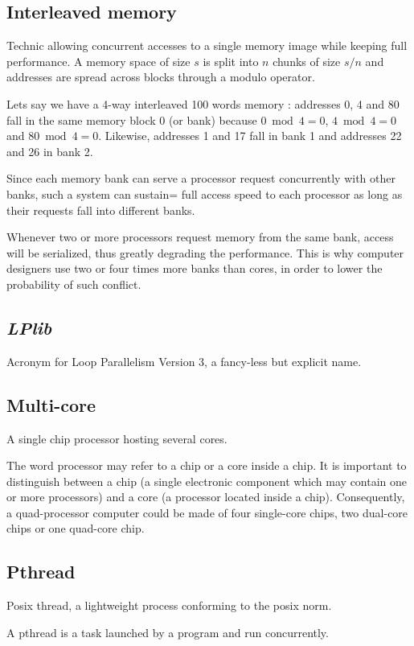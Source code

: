 \documentclass[a4paper,12pt]{article}
\begin{document}
\subsection{Interleaved memory}
Technic allowing concurrent accesses to a single memory image while keeping full performance. A memory space of size $s$ is split into $n$ chunks of size $s/n$ and addresses are spread across blocks through a modulo operator.

Lets say we have a 4-way interleaved 100 words memory :
addresses 0, 4 and 80 fall in the same memory block 0 (or bank) because $0 \bmod 4 = 0$, $4 \bmod 4 = 0$ and $80 \bmod 4 = 0$. Likewise, addresses 1 and 17 fall in bank 1 and addresses 22 and 26 in bank 2.

Since each memory bank can serve a processor request concurrently with other banks, such a system can sustain= full access speed to each processor as long as their requests fall into different banks.

Whenever two or more processors request memory from the same bank, access will be serialized, thus greatly degrading the performance. This is why computer designers use two or four times more banks than cores, in order to lower the probability of such conflict.

\subsection{\emph{LPlib}}
Acronym for Loop Parallelism Version 3, a fancy-less but explicit name.

\subsection{Multi-core}
A single chip processor hosting several cores.

The word processor may refer to a chip or a core inside a chip. It is important to distinguish between a chip (a single electronic component which may contain one or more processors) and a core (a processor located inside a chip). Consequently, a quad-processor computer could be made of four single-core chips, two dual-core chips or one quad-core chip.

\subsection{Pthread}
Posix thread, a lightweight process conforming to the posix norm.

A pthread is a task launched by a program and run concurrently.
\end{document}
